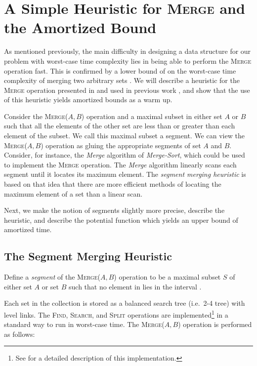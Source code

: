 \documentclass[11pt]{article}
\newcommand{\kwMs}{Make-Set}
\newcommand{\kwSpl}{Split}
\newcommand{\kwUnion}{Merge}
\newcommand{\kwSrc}{Search}
\newcommand{\kwFind}{Find}
\newcommand{\Ms}{\mbox{\textsc{\kwMs}}}
\newcommand{\Spl}{\mbox{\textsc{\kwSpl}}}
\newcommand{\Union}{\mbox{\textsc{\kwUnion{}}}}
\newcommand{\Unionx}[2]{\mbox{\textsc{\kwUnion(\ensuremath{#1,#2})}}}
\newcommand{\Src}{\mbox{\textsc{\kwSrc}}}
\newcommand{\Find}{\mbox{\textsc{\kwFind}}}
\newcommand{\segments}{{\segment}s}
\newcommand{\segment}{segment}
\newcommand{\Segment}{Segment}
\newcommand{\intl}[1]{\ensuremath{#1}}
\newcommand{\set}[1]{\ensuremath{#1}}
\newcommand{\hide}[1]{}
\begin{document}
\section{A Simple Heuristic for \Union{} and the  Amortized Bound} 
\label{sec:LogSQ} 


As mentioned previously, the main difficulty in designing a data structure for our problem with   worst-case time complexity lies in being able to perform the \Union{} operation fast. This is confirmed by a lower bound of  on the worst-case time complexity of merging two arbitrary sets \cite{conf/soda/DemaineLM00}. We will describe a heuristic for the \Union{} operation presented in \cite{conf/soda/DemaineLM00} and used in previous work \cite{DBLP:journals/talg/GeorgiadisKSTW11, klaithesis}, and show that the use of this heuristic yields  amortized bounds as a warm up. 


Consider the \Unionx{A}{B} operation and a maximal subset in either set \set A or \set B such that all the elements of the other set are less than or greater than each element of the subset. We call this maximal subset a \segment. We can view the \Unionx{A}{B} operation as gluing the appropriate \segments{} of set \set A and \set B. Consider, for instance, the \textit{Merge} algorithm of \textit{Merge-Sort}, which could be used to implement the \Union{} operation. The \textit{Merge} algorithm linearly scans each \segment{} until it locates its maximum element. The \textit{\segment{} merging heuristic} is based on that idea that there are more efficient methods of locating the maximum element of a set than a linear scan. 



Next, we make the notion of \segments{} slightly more precise, describe the heuristic, and describe the potential function which yields an upper bound of amortized  time. 


\subsection{The \Segment{} Merging Heuristic} 
\label{subsec:LogSQIntSubApp} 

Define a \emph{\segment} of the \Unionx{A}{B} operation to be a maximal subset \intl S of either set \set A or set \set B such that no element in  lies in the interval . 
  
Each set in the collection is stored as a balanced search tree (i.e.~2-4 tree) with level links. The \hide{\Ms{}, }\Find{}, \Src{}, and \Spl{} operations are implemented\footnote{See \cite{klaithesis} for a detailed description of this implementation.} in a standard way to run in  worst-case time. The \Unionx{A}{B} operation is performed as follows: 
  
\end{document}
